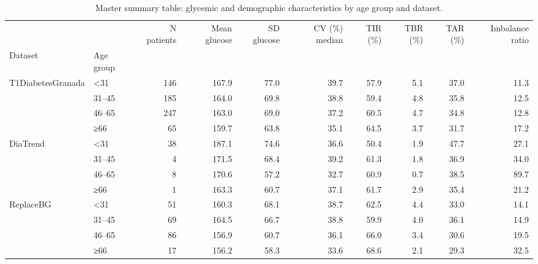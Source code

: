 \begin{table}
\caption{Master summary table: glycemic and demographic characteristics by age group and dataset.}
\label{tab:master_summary}
\begin{tabular}{llrrrrrrrr}
\toprule
 &  & N patients & Mean glucose & SD glucose & CV (\%) median & TIR (\%) & TBR (\%) & TAR (\%) & Imbalance ratio \\
Dataset & Age group &  &  &  &  &  &  &  &  \\
\midrule
\multirow[t]{4}{*}{T1DiabetesGranada} & <31 & 146 & 167.9 & 77.0 & 39.7 & 57.9 & 5.1 & 37.0 & 11.3 \\
 & 31–45 & 185 & 164.0 & 69.8 & 38.8 & 59.4 & 4.8 & 35.8 & 12.5 \\
 & 46–65 & 247 & 163.0 & 69.0 & 37.2 & 60.5 & 4.7 & 34.8 & 12.8 \\
 & ≥66 & 65 & 159.7 & 63.8 & 35.1 & 64.5 & 3.7 & 31.7 & 17.2 \\
\cline{1-10}
\multirow[t]{4}{*}{DiaTrend} & <31 & 38 & 187.1 & 74.6 & 36.6 & 50.4 & 1.9 & 47.7 & 27.1 \\
 & 31–45 & 4 & 171.5 & 68.4 & 39.2 & 61.3 & 1.8 & 36.9 & 34.0 \\
 & 46–65 & 8 & 170.6 & 57.2 & 32.7 & 60.9 & 0.7 & 38.5 & 89.7 \\
 & ≥66 & 1 & 163.3 & 60.7 & 37.1 & 61.7 & 2.9 & 35.4 & 21.2 \\
\cline{1-10}
\multirow[t]{4}{*}{ReplaceBG} & <31 & 51 & 160.3 & 68.1 & 38.7 & 62.5 & 4.4 & 33.0 & 14.1 \\
 & 31–45 & 69 & 164.5 & 66.7 & 38.8 & 59.9 & 4.0 & 36.1 & 14.9 \\
 & 46–65 & 86 & 156.9 & 60.7 & 36.1 & 66.0 & 3.4 & 30.6 & 19.5 \\
 & ≥66 & 17 & 156.2 & 58.3 & 33.6 & 68.6 & 2.1 & 29.3 & 32.5 \\
\cline{1-10}
\bottomrule
\end{tabular}
\end{table}
